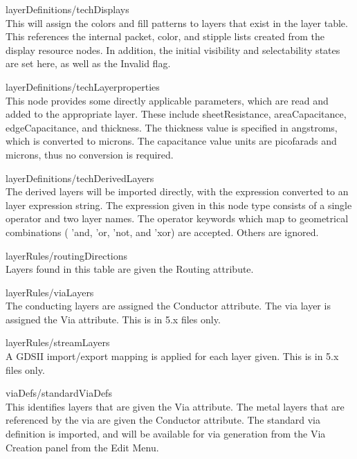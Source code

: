 \begin{description}
\item{\vt layerDefinitions/techDisplays}\\
This will assign the colors and fill patterns to layers that exist in
the {\Xic} layer table.  This references the internal packet, color,
and stipple lists created from the display resource nodes.  In
addition, the initial visibility and selectability states are set
here, as well as the {\et Invalid} flag.

\item{\vt layerDefinitions/techLayerproperties}\\
This node provides some directly applicable parameters, which are read
and added to the appropriate layer.  These include {\vt
sheetResistance}, {\vt areaCapacitance}, {\vt edgeCapacitance}, and
{\vt thickness}.  The thickness value is specified in angstroms, which
is converted to microns.  The capacitance value units are picofarads
and microns, thus no conversion is required.

\item{\vt layerDefinitions/techDerivedLayers}\\
The derived layers will be imported directly, with the expression
converted to an {\Xic} layer expression string.  The expression given
in this node type consists of a single operator and two layer names. 
The operator keywords which map to geometrical combinations ({\vt
'and}, {\vt 'or}, {\vt 'not}, and {\vt 'xor}) are accepted.  Others
are ignored.

\item{\vt layerRules/routingDirections}\\
Layers found in this table are given the {\vt Routing} attribute.

\item{\vt layerRules/viaLayers}\\
The conducting layers are assigned the {\vt Conductor} attribute.  The
via layer is assigned the {\vt Via} attribute.  This is in 5.x files
only.

\item{\vt layerRules/streamLayers}\\
A GDSII import/export mapping is applied for each layer given.  This
is in 5.x files only.

\item{\vt viaDefs/standardViaDefs}\\
This identifies layers that are given the {\vt Via} attribute.  The
metal layers that are referenced by the via are given the {\vt
Conductor} attribute.  The standard via definition is imported, and
will be available for via generation from the {\cb Via Creation} panel
from the {\cb Edit Menu}.


\end{description}
